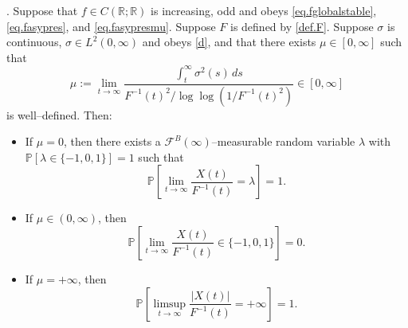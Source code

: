 \documentclass[10pt,a4paper]{amsart}
\begin{document}
	\begin{theorem}  \label{thm.Xwithouttailmart}.
		Suppose that $f\in C(\mathbb{R};\mathbb{R})$ is increasing, odd and obeys \eqref{eq.fglobalstable}, \eqref{eq.fasypres}, and \eqref{eq.fasypresmu}. Suppose $F$ is defined by \eqref{def.F}. 
		Suppose $\sigma$ is continuous, $\sigma \in L^2(0,\infty)$ and obeys \eqref{d}, and that there exists $\mu \in [0,\infty]$ such that
		\[
		\mu := \lim_{t \to \infty} \frac{\int_t^\infty \sigma^2(s)\, ds }{F^{-1}(t)^2/\log\log(1/F^{-1}(t)^2)}\in [0,\infty]
		\]
		is well--defined. Then:
		\begin{itemize}
			\item[(i)] If $\mu = 0$, then there exists a $\mathcal{F}^B(\infty)$--measurable random variable $\lambda$ with $\mathbb{P}[\lambda\in \{-1,0,1\}]=1$ such that 
			\[
			\mathbb{P}\left[ \lim_{t \to \infty} \frac{X(t)}{F^{-1}(t)} =\lambda \right] = 1.
			\]
			\item[(ii)] If $\mu \in (0,\infty)$, then
			\[
			\mathbb{P}\left[ \lim_{t \to \infty} \frac{X(t)}{F^{-1}(t)} \in \{-1,0,1\} \right] = 0.
			\]
			\item[(iii)] If $\mu=+\infty$, then 
			\[
			\mathbb{P}\left[ \limsup_{t \to \infty} \frac{|X(t)|}{F^{-1}(t)} =+\infty \right] = 1.
			\]
		\end{itemize}
	\end{theorem}
\end{document}
